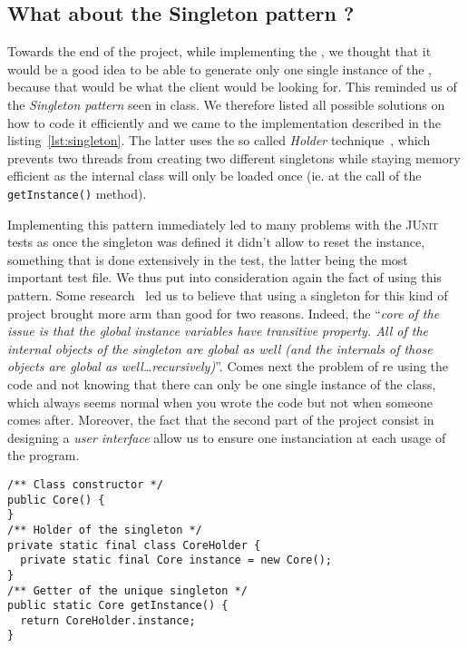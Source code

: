 \subsection{What about the Singleton pattern ?} %
\label{sub:what_about_the_singleton_pattern}
Towards the end of the project, while implementing the \Core,
we thought that it would be a good idea to be able
to generate only one single instance of the \Core,
because that would be what the client would be looking for.
This reminded us of the \emph{Singleton pattern} seen in class.
We therefore listed all possible solutions on how to code
it efficiently and we came to the implementation described
in the listing~\ref{lst:singleton}.
The latter uses the so called \emph{Holder} technique~\cite{goodSingleton},
which prevents two threads from creating two different singletons
while staying memory efficient as the internal class will only be
loaded once (ie. at the call of the \lstinline|getInstance()| method).

Implementing this pattern immediately led to many problems with
the \textsc{JUnit} tests as once the singleton was defined it
didn't allow to reset the instance, something that is done extensively
in the \Core test, the latter being the most important test file.
We thus put into consideration again the fact of using this pattern.
Some research~\cite{singletonLiars} led us to believe that using a singleton for this kind
of project brought more arm than good for two reasons.
Indeed, the ``\textit{core of the issue is that the global instance 
variables have transitive property. All of the internal objects of the 
singleton are global as well (and the internals of those objects are 
global as well\dots recursively)}''\cite{codeHardToTest}.
Comes next the problem of re using the code and not knowing that
there can only be one single instance of the \Core class,
which always seems normal when you wrote the code but not
when someone comes after.
Moreover, the fact that the second part of the project consist in
designing a \emph{user interface} allow us to ensure one instanciation
at each usage of the program.

\begin{lstlisting}[caption=How the implementation of the Singleton pattern
  would be.,
  label=lst:singleton] 
/** Class constructor */
public Core() {
}
/** Holder of the singleton */
private static final class CoreHolder {		
  private static final Core instance = new Core();
}
/** Getter of the unique singleton */
public static Core getInstance() {
  return CoreHolder.instance;
}
\end{lstlisting}
  

